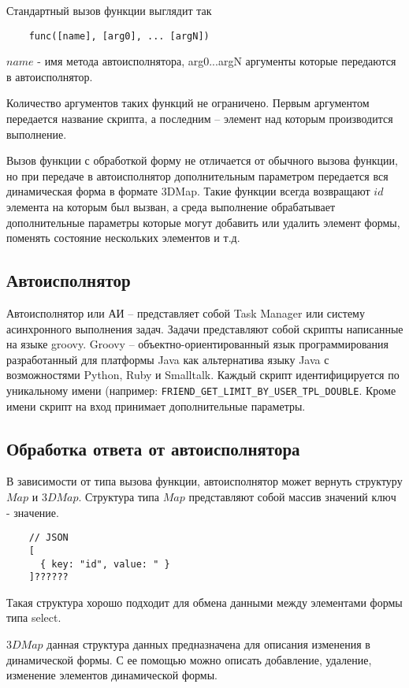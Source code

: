 \documentclass[../index.tex]{subfiles}
\begin{document}
Стандартный вызов функции выглядит так
\begin{verbatim}
    func([name], [arg0], ... [argN])
\end{verbatim}

$name$ - имя метода автоисполнятора, arg0...argN аргументы которые передаются в автоисполнятор.

Количество аргументов таких функций не ограничено. Первым аргументом передается название скрипта, 
а последним -- элемент над которым производится выполнение.

Вызов функции с обработкой форму не отличается от обычного вызова функции, но при передаче в автоисполнятор
дополнительным параметром передается вся динамическая форма в формате 3DMap. 
Такие функции всегда возвращают $id$ элемента на которым был вызван, а среда выполнение обрабатывает 
дополнительные параметры которые могут добавить или удалить элемент формы, поменять состояние нескольких элементов
и т.д.  

\subsection{Автоисполнятор}

Автоисполнятор или АИ -- представляет собой Task Manager или систему асинхронного выполнения задач. 
Задачи представляют собой скрипты написанные на языке groovy. 
Groovy -- объектно-ориентированный язык программирования разработанный для платформы 
Java как альтернатива языку Java с возможностями Python, Ruby и Smalltalk. 
Каждый скрипт идентифицируется по уникальному имени (например: \verb|FRIEND_GET_LIMIT_BY_USER_TPL_DOUBLE|. 
Кроме имени скрипт на вход принимает дополнительные параметры. 

\subsection{Обработка ответа от автоисполнятора}

В зависимости от типа вызова функции, автоисполнятор может вернуть структуру $Map$ и $3DMap$.
Структура типа $Map$ представляют собой массив значений $ключ$ - $значение$.

\begin{verbatim}
    // JSON 
    [
      { key: "id", value: " }
    ]??????
\end{verbatim}

Такая структура хорошо подходит для обмена данными между элементами формы типа select.

$3DMap$ данная структура данных предназначена для описания изменения в динамической формы.
С ее помощью можно описать добавление, удаление, изменение элементов динамической формы.
\end{document}
